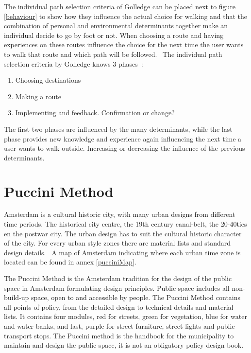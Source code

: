 The individual path selection criteria of Golledge can be placed next to figure \ref{behaviour} to show how they influence the actual choice for walking and that the combination of personal and environmental determinants together make an individual decide to go by foot or not. When choosing a route and having experiences on these routes influence the choice for the next time the user wants to walk that route and which path will be followed.~\cite{Golledge2002} The individual path selection criteria by Golledge knows 3 phases~\cite{Golledge2002}: 
\begin{enumerate}
\item Choosing destinations 
\item Making a route 
\item Implementing and feedback. Confirmation or change?
\end{enumerate}
The first two phases are influenced by the many determinants, while the last phase provides new knowledge and experience again influencing the next time a user wants to walk outside. Increasing or decreasing the influence of the previous determinants. 


\section{Puccini Method}\label{puccini}
Amsterdam is a cultural historic city, with many urban designs from different time periods. The historical city centre, the 19th century canal-belt, the 20-40ties en the postwar city. The urban design has to suit the cultural historic character of the city. For every urban style zones there are material lists and standard design details.~\cite{puccini2014} A map of Amsterdam indicating where each urban time zone is located can be found in annex \ref{pucciniMap}.

The Puccini Method is the Amsterdam tradition for the design of the public space in Amsterdam formulating design principles. Public space includes all non-build-up space, open to and accessible by people. The Puccini Method contains all points of policy, from the detailed design to technical details and material lists. It contains four modules, red for streets, green for vegetation, blue for water and water banks, and last, purple for street furniture, street lights and public transport stops. 
The Puccini method is the handbook for the municipality to maintain and design the public space, it is not an obligatory policy design book.~\cite{puccini2014}

